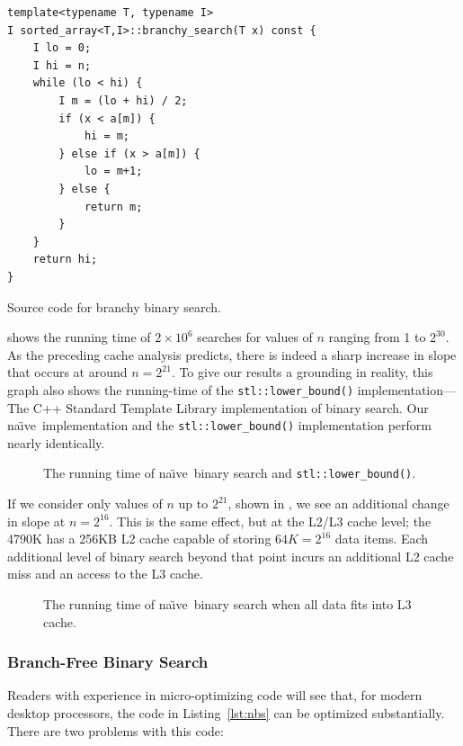 \documentclass{patmorin}
\newcommand{\lstlabel}[1]{\label{lst:#1}}
\newcommand{\lstref}[1]{Listing~\ref{lst:#1}}
\newcommand{\naive}{na\"{\i}ve}
\begin{document}
\begin{listing}
\begin{verbatim}
template<typename T, typename I>
I sorted_array<T,I>::branchy_search(T x) const {
    I lo = 0;
    I hi = n;
    while (lo < hi) {
        I m = (lo + hi) / 2;
        if (x < a[m]) {
            hi = m;
        } else if (x > a[m]) {
            lo = m+1;
        } else {
            return m;
        }
    }
    return hi;
}
\end{verbatim}
\caption{Source code for branchy binary search.}
\lstlabel{nbs}
\end{listing}


 shows the running time of $2\times 10^6$ searches
for values of $n$ ranging from 1 to $2^{30}$. As the preceding cache analysis
predicts, there is indeed a sharp increase in slope that occurs at around
$n=2^{21}$.  To give our results a grounding in reality, this graph
also shows the running-time of the \texttt{stl::lower_bound()}
implementation---The C++ Standard Template Library implementation
of binary search.  Our \naive\ implementation and the
\texttt{stl::lower_bound()} implementation perform nearly
identically.


\begin{figure}
   \caption{The running time of \naive\ binary search and 
            \texttt{stl::lower_bound()}.}
\end{figure}

If we consider only values of $n$ up to $2^{21}$, shown in
, we see an additional change in slope at
$n=2^{16}$.  This is the same effect, but at the L2/L3 cache level; the
4790K has a 256KB L2 cache capable of storing $64K=2^{16}$ data items.
Each additional level of binary search beyond that point incurs an
additional L2 cache miss and an access to the L3 cache.

\begin{figure}
   \caption{The running time of \naive\ binary search when all data
    fits into L3 cache.}
\end{figure}


\subsubsection{Branch-Free Binary Search}

Readers with experience in micro-optimizing code will see that, for
modern desktop processors, the code in \lstref{nbs} can be optimized
substantially.  There are two problems with this code:
\end{document}
